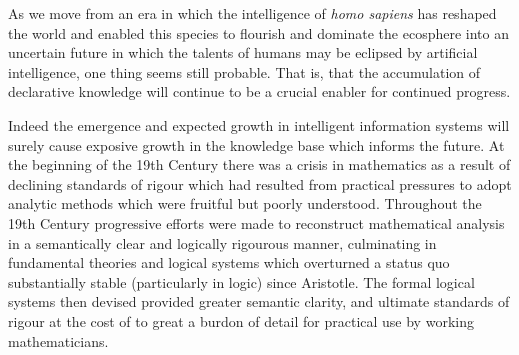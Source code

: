 As we move from an era in which the intelligence of \emph{homo sapiens} has reshaped the world and enabled this species to flourish and dominate the ecosphere into an uncertain future in which the talents of humans may be eclipsed by artificial intelligence, one thing seems still probable.
That is, that the accumulation of declarative knowledge will continue to be a crucial enabler for continued progress.

Indeed the emergence and expected growth in intelligent information systems will surely cause exposive growth in the knowledge base which informs the future.
At the beginning of the 19th Century there was a crisis in mathematics as a result of declining standards of rigour which had resulted from practical pressures to adopt analytic methods which were fruitful but poorly understood.
Throughout the 19th Century progressive efforts were made to reconstruct mathematical analysis in a semantically clear and logically rigourous manner, culminating in fundamental theories and logical systems which overturned a status quo substantially stable (particularly in logic) since Aristotle.
The formal logical systems then devised provided greater semantic clarity, and ultimate standards of rigour at the cost of to great a burdon of detail for practical use by working mathematicians.
